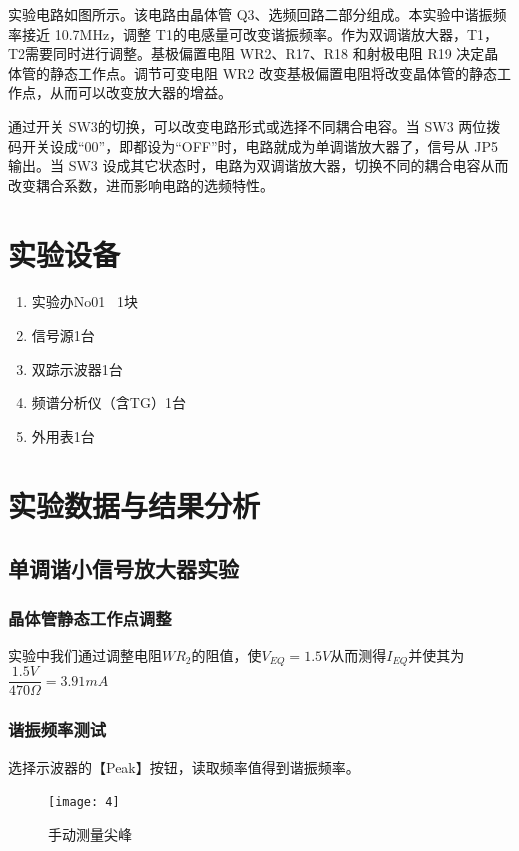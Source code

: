 \documentclass{../source/Experiment}
\begin{document}
实验电路如图所示。该电路由晶体管 Q3、选频回路二部分组成。本实验中谐振频率接近 10.7MHz，调整 T1的电感量可改变谐振频率。作为双调谐放大器，T1，T2需要同时进行调整。基极偏置电阻 WR2、R17、R18 和射极电阻 R19 决定晶体管的静态工作点。调节可变电阻 WR2 改变基极偏置电阻将改变晶体管的静态工作点，从而可以改变放大器的增益。

通过开关 SW3的切换，可以改变电路形式或选择不同耦合电容。当 SW3 两位拨码开关设成“00”，即都设为“OFF”时，电路就成为单调谐放大器了，信号从 JP5 输出。当 SW3 设成其它状态时，电路为双调谐放大器，切换不同的耦合电容从而改变耦合系数，进而影响电路的选频特性。

\section{实验设备}
\begin{enumerate}
    \item 实验办No01 \, 1块
    \item 信号源1台
    \item 双踪示波器1台
    \item 频谱分析仪（含TG）1台
    \item 外用表1台
\end{enumerate}

\section{实验数据与结果分析}
\subsection{单调谐小信号放大器实验}
\subsubsection{晶体管静态工作点调整}

实验中我们通过调整电阻$WR_2$的阻值，使$V_{EQ} = 1.5V$从而测得$I_{EQ}$并使其为$\dfrac{1.5V}{470\Omega} = 3.91mA$

\subsubsection{谐振频率测试}

选择示波器的【Peak】按钮，读取频率值得到谐振频率。

\begin{figure}[H]
    \centering
    \texttt{[image: 4]}
    \caption{手动测量尖峰}
\end{figure}
\end{document}
